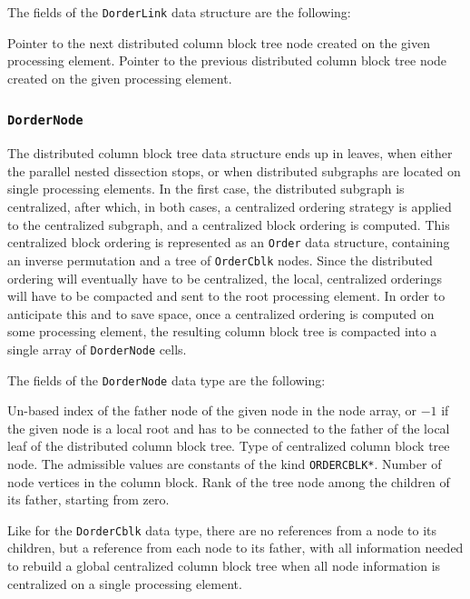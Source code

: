 The fields of the \texttt{DorderLink} data structure are the following:
\begin{itemize}
  Pointer to the next distributed column block tree node created on
  the given processing element.
  Pointer to the previous distributed column block tree node created
  on the given processing element.
\end{itemize}

\subsubsection{\texttt{DorderNode}}
\label{sec-data-dorder-node}

The distributed column block tree data structure ends up in leaves,
when either the parallel nested dissection stops, or when distributed
subgraphs are located on single processing elements. In the first
case, the distributed subgraph is centralized, after which, in both
cases, a centralized ordering strategy is applied to the centralized
subgraph, and a centralized block ordering is computed. This
centralized block ordering is represented as an \texttt{Order}
data structure, containing an inverse permutation and a tree of
\texttt{Order\lbt Cblk} nodes. Since the distributed ordering will
eventually have to be centralized, the local, centralized orderings
will have to be compacted and sent to the root processing
element. In order to anticipate this and to save space, once a
centralized ordering is computed on some processing element, the
resulting column block tree is compacted into a single array of
\texttt{Dorder\lbt Node} cells.

The fields of the \texttt{DorderNode} data type are the following:
\begin{itemize}
  Un-based index of the father node of the given node in the node
  array, or $-1$ if the given node is a local root and has to be
  connected to the father of the local leaf of the distributed column
  block tree.
  Type of centralized column block tree node. The admissible values
  are constants of the kind \texttt{ORDERCBLK*}.
  Number of node vertices in the column block.
  Rank of the tree node among the children of its father, starting
  from zero.
\end{itemize}

Like for the \texttt{Dorder\lbt Cblk} data type, there are no
references from a node to its children, but a reference from each node
to its father, with all information needed to rebuild a global
centralized column block tree when all node information is centralized
on a single processing element.

